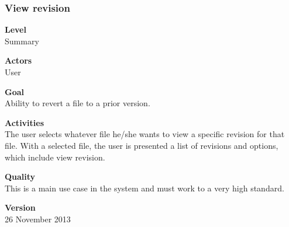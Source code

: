 \documentclass[12pt,a4paper]{article}
\begin{document}
\subsubsection{View revision}
\begin{description}
	\item \textbf{Level}  \\
	Summary
	\item \textbf{Actors} \\
	User
	\item \textbf{Goal} \\
	Ability to revert a file to a prior version.
	\item \textbf{Activities} \\
	The user selects whatever file he/she wants to view a specific revision for that file. With a selected file, the user is presented a list of revisions and options, which include view revision. 
	\item \textbf{Quality} \\
	This is a main use case in the system and must work to a very high standard. 
	\item \textbf{Version} \\
	26 November 2013	
\end{description}
\end{document}
